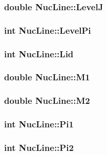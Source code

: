 \subsubsection{\setlength{\rightskip}{0pt plus 5cm}double \bf{Nuc\-Line::Level\-J}}\label{structNucLine_e70284ef1f4df9794e08f80feaff6906}


\subsubsection{\setlength{\rightskip}{0pt plus 5cm}int \bf{Nuc\-Line::Level\-Pi}}\label{structNucLine_991307519e20f9d9a92383bdf3878441}


\subsubsection{\setlength{\rightskip}{0pt plus 5cm}int \bf{Nuc\-Line::Lid}}\label{structNucLine_ebe346a286516115e911824d93586de1}


\subsubsection{\setlength{\rightskip}{0pt plus 5cm}double \bf{Nuc\-Line::M1}}\label{structNucLine_8216ea3e948c1c939e68787783036d12}


\subsubsection{\setlength{\rightskip}{0pt plus 5cm}double \bf{Nuc\-Line::M2}}\label{structNucLine_4231e038923cff0d95fa6b92ba6aa447}


\subsubsection{\setlength{\rightskip}{0pt plus 5cm}int \bf{Nuc\-Line::Pi1}}\label{structNucLine_49d0ae4e0d36acf146c551ee236745e6}


\subsubsection{\setlength{\rightskip}{0pt plus 5cm}int \bf{Nuc\-Line::Pi2}}\label{structNucLine_3984d1f80264d8412d83045530101319}


